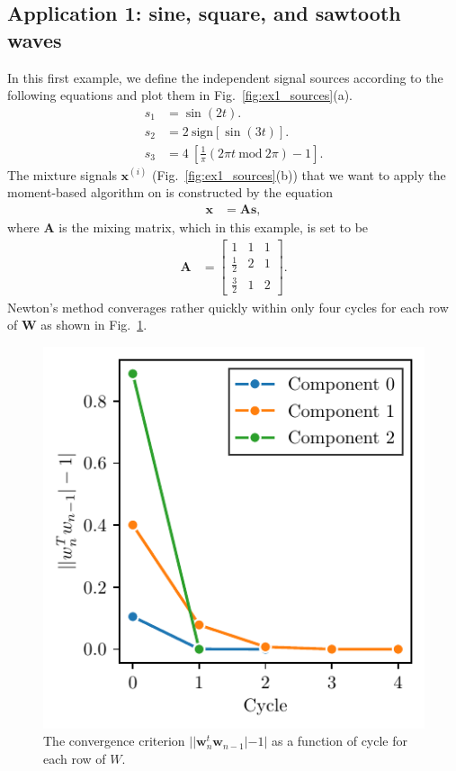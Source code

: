 \documentclass[aps,prl,preprint,superscriptaddress]{revtex4-2}
\begin{document}
\subsection{Application 1: sine, square, and sawtooth waves}
In this first example, we define the independent signal sources according to the following equations and plot them in Fig.~\ref{fig:ex1_sources}(a).
\begin{align}
s_1 &= \sin(2 t). \nonumber \\
s_2 &= 2~\mathrm{sign} [\sin(3 t)]. \nonumber \\
s_3 &= 4~\left[\frac{1}{\pi} (2 \pi t~\mathrm{mod}~2\pi) - 1\right]. \label{eq:ex1_sources}
\end{align}
The mixture signals $\mathbf{x}^{(i)}$ (Fig.~\ref{fig:ex1_sources}(b)) that we want to apply the moment-based algorithm on is constructed by the equation
\begin{align}
\mathbf{x} &= \mathbf{A} \mathbf{s},
\end{align}
where $\mathbf{A}$ is the mixing matrix, which in this example, is set to be
\begin{align}
\mathbf{A} &= \begin{bmatrix}
1 & 1 & 1 \\
\frac{1}{2} & 2 & 1 \\
\frac{3}{2} & 1 & 2
\end{bmatrix}. \label{eq:ex1_mixing}
\end{align}
Newton's method converages rather quickly within only four cycles for each row of $\mathbf{W}$ as shown in Fig.~\ref{fig:ex1_dist}.
\begin{figure}
\includegraphics{scripts/ex1_dist.pdf}
\caption{\label{fig:ex1_dist} The convergence criterion $||\mathbf{w}_{n}^t \mathbf{w}_{n-1}| - 1|$ as a function of cycle for each row of $W$.}
\end{figure}
\end{document}
